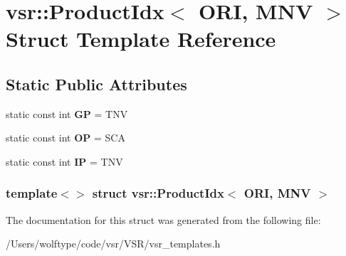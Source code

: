 \hypertarget{structvsr_1_1_product_idx_3_01_o_r_i_00_01_m_n_v_01_4}{\section{vsr\-:\-:Product\-Idx$<$ O\-R\-I, M\-N\-V $>$ Struct Template Reference}
\label{structvsr_1_1_product_idx_3_01_o_r_i_00_01_m_n_v_01_4}
}
\subsection*{Static Public Attributes}
\begin{DoxyCompactItemize}
\item 
\hypertarget{structvsr_1_1_product_idx_3_01_o_r_i_00_01_m_n_v_01_4_a30a813c0a3c7e19903a8e17776ca9e7d}{static const int {\bfseries G\-P} = T\-N\-V}\label{structvsr_1_1_product_idx_3_01_o_r_i_00_01_m_n_v_01_4_a30a813c0a3c7e19903a8e17776ca9e7d}

\item 
\hypertarget{structvsr_1_1_product_idx_3_01_o_r_i_00_01_m_n_v_01_4_acdb95d221338d4b30c25b935b0aa5500}{static const int {\bfseries O\-P} = S\-C\-A}\label{structvsr_1_1_product_idx_3_01_o_r_i_00_01_m_n_v_01_4_acdb95d221338d4b30c25b935b0aa5500}

\item 
\hypertarget{structvsr_1_1_product_idx_3_01_o_r_i_00_01_m_n_v_01_4_a4d18e87acc900ac65ea0cf56975c4dc4}{static const int {\bfseries I\-P} = T\-N\-V}\label{structvsr_1_1_product_idx_3_01_o_r_i_00_01_m_n_v_01_4_a4d18e87acc900ac65ea0cf56975c4dc4}

\end{DoxyCompactItemize}
\subsubsection*{template$<$$>$ struct vsr\-::\-Product\-Idx$<$ O\-R\-I, M\-N\-V $>$}



The documentation for this struct was generated from the following file\-:\begin{DoxyCompactItemize}
\item 
/\-Users/wolftype/code/vsr/\-V\-S\-R/vsr\-\_\-templates.\-h\end{DoxyCompactItemize}
